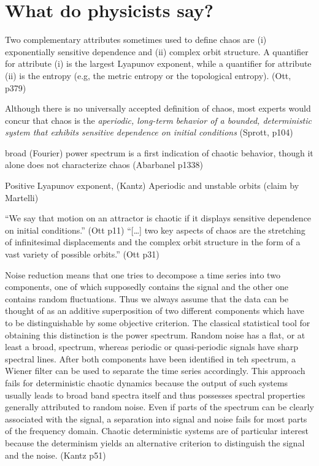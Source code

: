 \documentclass[11pt]{article}
\begin{document}
\section{What do physicists say?}
Two complementary attributes sometimes used to define chaos are
(i) exponentially sensitive dependence and
(ii) complex orbit structure.
A quantifier for attribute (i) is the largest Lyapunov exponent, while
a quantifier for attribute (ii) is the entropy (e.g, the metric entropy
or the topological entropy).
(Ott, p379)

Although there is no universally accepted definition of chaos,
most experts would concur that chaos is the {\it aperiodic,
  long-term behavior of a bounded, deterministic system
that exhibits sensitive dependence on initial conditions} (Sprott, p104)

broad (Fourier) power spectrum is a first indication of chaotic behavior,
though it alone does not characterize chaos (Abarbanel p1338)

Positive Lyapunov exponent, (Kantz)
Aperiodic and unstable orbits (claim by Martelli)

``We say that motion on an attractor is chaotic if
it displays sensitive dependence on initial conditions.'' (Ott p11)
``[\ldots] two key aspects of chaos are the stretching of infinitesimal displacements
and the complex orbit structure in the form of a vast variety of possible orbits.'' (Ott p31)

Noise reduction means that one tries to decompose a time series into
two components, one of which supposedly contains the signal and the other
one contains random fluctuations. Thus we always assume that the data
can be thought of as an additive superposition of two different components which
have to be distinguishable by some objective criterion. The classical statistical
tool for obtaining this distinction is the power spectrum. Random noise has
a flat, or at least a broad, spectrum, whereas periodic or quasi-periodic
signals have sharp spectral lines. After both components have been identified
in teh spectrum, a Wiener filter can be used to separate the time series
accordingly.
This approach fails for deterministic chaotic dynamics because the output
of such systems usually leads to broad band spectra itself and thus possesses
spectral properties generally attributed to random noise. Even if parts of the
spectrum can be clearly associated with the signal, a separation into signal and
noise fails for most parts of the frequency domain. Chaotic deterministic systems
are of particular interest because the determinism yields an alternative criterion
to distinguish the signal and the noise. (Kantz p51)
\end{document}
